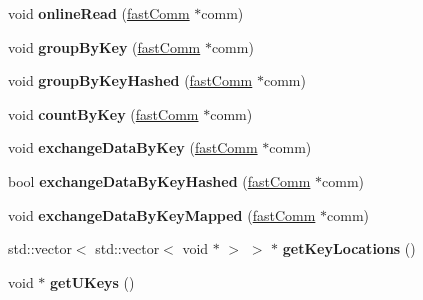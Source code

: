 \begin{DoxyCompactItemize}
void {\bfseries online\+Read} (\hyperlink{classfaster_1_1fastComm}{fast\+Comm} $\ast$comm)
\item 
\hypertarget{classfaster_1_1workerIFddCore_a24fcf2970ad4871bee0ccc1f0ecfca71}{}\label{classfaster_1_1workerIFddCore_a24fcf2970ad4871bee0ccc1f0ecfca71} 
void {\bfseries group\+By\+Key} (\hyperlink{classfaster_1_1fastComm}{fast\+Comm} $\ast$comm)
\item 
\hypertarget{classfaster_1_1workerIFddCore_a5d6a3d8153d98739dffe236eedde99b5}{}\label{classfaster_1_1workerIFddCore_a5d6a3d8153d98739dffe236eedde99b5} 
void {\bfseries group\+By\+Key\+Hashed} (\hyperlink{classfaster_1_1fastComm}{fast\+Comm} $\ast$comm)
\item 
\hypertarget{classfaster_1_1workerIFddCore_a61548cbc82deeee27391b14017498bc9}{}\label{classfaster_1_1workerIFddCore_a61548cbc82deeee27391b14017498bc9} 
void {\bfseries count\+By\+Key} (\hyperlink{classfaster_1_1fastComm}{fast\+Comm} $\ast$comm)
\item 
\hypertarget{classfaster_1_1workerIFddCore_a9ec095741edf6f50d3acab3557c3302e}{}\label{classfaster_1_1workerIFddCore_a9ec095741edf6f50d3acab3557c3302e} 
void {\bfseries exchange\+Data\+By\+Key} (\hyperlink{classfaster_1_1fastComm}{fast\+Comm} $\ast$comm)
\item 
\hypertarget{classfaster_1_1workerIFddCore_a7adac483239267af18c122f6a55eb6b7}{}\label{classfaster_1_1workerIFddCore_a7adac483239267af18c122f6a55eb6b7} 
bool {\bfseries exchange\+Data\+By\+Key\+Hashed} (\hyperlink{classfaster_1_1fastComm}{fast\+Comm} $\ast$comm)
\item 
\hypertarget{classfaster_1_1workerIFddCore_a57591b34987523dede8c77f00f3678c6}{}\label{classfaster_1_1workerIFddCore_a57591b34987523dede8c77f00f3678c6} 
void {\bfseries exchange\+Data\+By\+Key\+Mapped} (\hyperlink{classfaster_1_1fastComm}{fast\+Comm} $\ast$comm)
\item 
\hypertarget{classfaster_1_1workerIFddCore_a9184015edf3f3f8a74a8f4fdd2e27960}{}\label{classfaster_1_1workerIFddCore_a9184015edf3f3f8a74a8f4fdd2e27960} 
std\+::vector$<$ std\+::vector$<$ void $\ast$ $>$ $>$ $\ast$ {\bfseries get\+Key\+Locations} ()
\item 
\hypertarget{classfaster_1_1workerIFddCore_ae09af34bae026620303ee637827a6f11}{}\label{classfaster_1_1workerIFddCore_ae09af34bae026620303ee637827a6f11} 
void $\ast$ {\bfseries get\+U\+Keys} ()
\item 
\hypertarget{classfaster_1_1workerIFddCore_ace41b3afb57c93a1797d0a377b59fd7b}{}\label{classfaster_1_1workerIFddCore_ace41b3afb57c93a1797d0a377b59fd7b} 

\end{DoxyCompactItemize}

